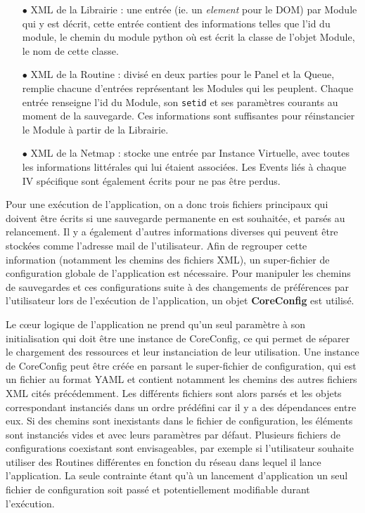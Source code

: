 \documentclass[]{article}
\begin{document}
\begin{itemize}
\item[$\bullet$] XML de la Librairie : une entrée (ie. un \textit{element} pour le DOM) par Module qui y est décrit, cette entrée contient des informations telles que l'id du module, le chemin du module python où est écrit la classe de l'objet Module, le nom de cette classe.
\vspace{0.2cm}
\item[$\bullet$] XML de la Routine : divisé en deux parties pour le Panel et la Queue, remplie chacune d'entrées représentant les Modules qui les peuplent. Chaque entrée renseigne l'id du Module, son \texttt{setid} et ses paramètres courants au moment de la sauvegarde. Ces informations sont suffisantes pour réinstancier le Module à partir de la Librairie.\\

\item[$\bullet$] XML de la Netmap : stocke une entrée par Instance Virtuelle, avec toutes les informations littérales qui lui étaient associées. Les Events liés à chaque IV spécifique sont également écrits pour ne pas être perdus. 
\end{itemize}
\vspace{0.2cm}

\par Pour une exécution de l'application, on a donc trois fichiers principaux qui doivent être écrits si une sauvegarde permanente en est souhaitée, et parsés au relancement. Il y a également d'autres informations diverses qui peuvent être stockées comme l'adresse mail de l'utilisateur. Afin de regrouper cette information (notamment les chemins des fichiers XML), un super-fichier de configuration globale de l'application est nécessaire. Pour manipuler les chemins de sauvegardes et ces configurations suite à des changements de préférences par l'utilisateur lors de l'exécution de l'application, un objet \textbf{CoreConfig} est utilisé.\\

\par Le cœur logique de l'application ne prend qu'un seul paramètre à son initialisation qui doit être une instance de CoreConfig, ce qui permet de séparer le chargement des ressources et leur instanciation de leur utilisation. Une instance de CoreConfig peut être créée en parsant le super-fichier de configuration, qui est un fichier au format YAML et contient notamment les chemins des autres fichiers XML cités précédemment. Les différents fichiers sont alors parsés et les objets correspondant instanciés dans un ordre prédéfini car il y a des dépendances entre eux. Si des chemins sont inexistants dans le fichier de configuration, les éléments sont instanciés vides et avec leurs paramètres par défaut. Plusieurs fichiers de configurations coexistant sont envisageables, par exemple si l'utilisateur souhaite utiliser des Routines différentes en fonction du réseau dans lequel il lance l'application. La seule contrainte étant qu'à un lancement d'application un seul fichier de configuration soit passé et potentiellement modifiable durant l'exécution.
\end{document}
